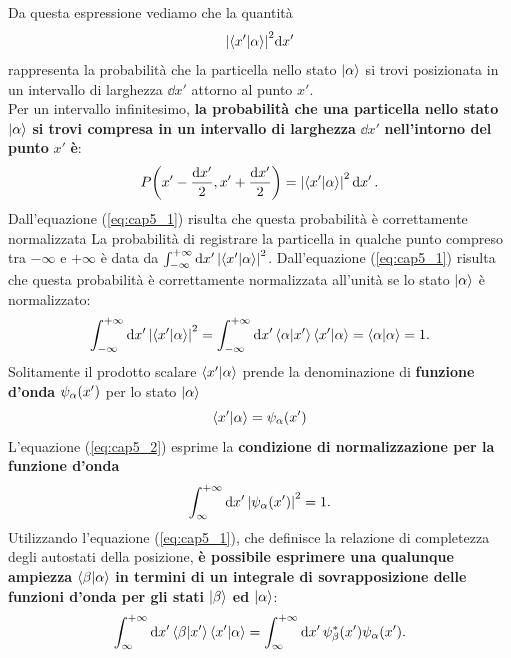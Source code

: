 Da questa espressione vediamo che la quantità
\begin{equation}
  \abs{\braket{x'}{\alpha}}^2\dd x'
\end{equation}
rappresenta la probabilità che la particella nello stato $\ket{\alpha}$ si trovi posizionata in un intervallo di larghezza $\dd{x'}$ attorno al punto $x'$.\\
Per un intervallo infinitesimo, \textbf{la probabilità che una particella nello stato }$\ket{\alpha}$ \textbf{si trovi compresa in un intervallo di larghezza }$\dd{x'}$ \textbf{nell'intorno del punto }$x'$ \textbf{è}:
\begin{equation}
  P\qty(x'-\frac{\dd{x'}}{2}, x'+\frac{\dd{x'}}{2}) = \abs{\braket{x'}{\alpha}}^2\dd{x'} .
\end{equation}
Dall'equazione (\ref{eq:cap5_1}) risulta che questa probabilità è correttamente normalizzata
La probabilità di registrare la particella in qualche punto compreso tra $-\infty$ e $+\infty$ è data da $\int_{-\infty}^{+\infty}\dd{x'}\abs{\braket{x'}{\alpha}}^2$.
Dall'equazione (\ref{eq:cap5_1}) risulta che questa probabilità è correttamente normalizzata all'unità se lo stato $\ket{\alpha}$ è normalizzato:
\begin{equation}
  \label{eq:cap5_2}
  \int_{-\infty}^{+\infty}\dd{x'}\abs{\braket{x'}{\alpha}}^2 = \int_{-\infty}^{+\infty}\dd{x'}\braket{\alpha}{x'}\braket{x'}{\alpha}=\braket{\alpha}{\alpha} = 1 .
\end{equation}
Solitamente il prodotto scalare $\braket{x'}{\alpha}$ prende la denominazione di \textbf{funzione d'onda} $\psi_{\alpha}\qty(x')$ per lo stato $\ket{\alpha}$
\begin{equation}
  \braket{x'}{\alpha} = \psi_{\alpha}\qty(x')
\end{equation}
L'equazione (\ref{eq:cap5_2}) esprime la \textbf{condizione di normalizzazione per la funzione d'onda}
\begin{equation}
  \int_{\infty}^{+\infty}\dd{x'}\abs{\psi_{\alpha}\qty(x')}^2=1 .
\end{equation}
Utilizzando l'equazione (\ref{eq:cap5_1}), che definisce la relazione di completezza degli autostati della posizione, \textbf{è possibile esprimere una qualunque ampiezza} $\braket{\beta}{\alpha}$ \textbf{in termini di un integrale di sovrapposizione delle funzioni d'onda per gli stati} $\ket{\beta}$ \textbf{ed} $\ket{\alpha}$:
\begin{equation}
  \int_{\infty}^{+\infty}\dd{x'}\braket{\beta}{x'}\braket{x'}{\alpha} = \int_{\infty}^{+\infty}\dd{x'} \psi^*_{\beta}\qty(x')\psi_{\alpha}\qty(x') .
\end{equation}
